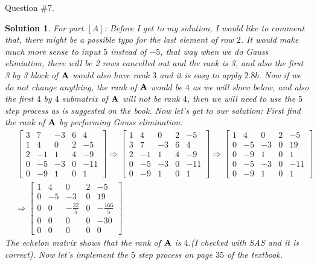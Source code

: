 \documentclass[11pt]{article}\usepackage[]{graphicx}\usepackage[]{color}
\newtheorem{sol}{Solution}
\begin{document}
Question $\# 7$.
\begin{sol}
	For part $[A]$:\vskip 2mm
	Before I get to my solution, I would like to comment that, there might be a possible typo for the last element of row $2$. It would make much more sense to input $5$ instead of $-5$, that way when we do Gauss elimiation, there will be 2 rows cancelled out and the rank is 3, and also the first 3 by 3 block of ${\bf A}$ would also have rank $3$ and it is easy to apply $2.8b$.\vskip 2mm
	Now if we do not change anything, the rank of ${\bf A}$ would be $4$ as we will show below, and also the first $4$ by $4$ submatrix of ${\bf A}$ will not be rank $4$, then we will need to use the $5$ step process as is suggested on the book. \vskip 2mm
	Now let's get to our solution:\vskip 2mm
	First find the rank of ${\bf A}$ by performing Gauss elimination:
	\begin{align*}
		&\  \left[\begin{array}{ccccc} 3&7&-3&6&4\\ 1&4&0&2&-5\\ 2&-1&1&4&-9\\ 0&-5&-3&0&-11\\ 0&-9&1&0&1\end{array}\right]\Longrightarrow \left[\begin{array}{ccccc} 1&4&0&2&-5\\ 3&7&-3&6&4\\ 2&-1&1&4&-9\\ 0&-5&-3&0&-11\\ 0&-9&1&0&1\end{array}\right] \Longrightarrow \left[\begin{array}{ccccc} 1&4&0&2&-5\\ 0&-5&-3&0&19\\ 0&-9&1&0&1\\ 0&-5&-3&0&-11\\ 0&-9&1&0&1\end{array}\right]\\
		&\Longrightarrow \left[\begin{array}{ccccc} 1&4&0&2&-5\\ 0&-5&-3&0&19\\ 0&0&-\frac{22}{5}&0&-\frac{166}{5}\\ 0&0&0&0&-30\\ 0&0&0&0&0\end{array}\right]
	\end{align*}
	The echelon matrix shows that the rank of ${\bf A}$ is $4$.(I checked with SAS and it is correct).\vskip 2mm
	Now let's implement the $5$ step process on page $35$ of the textbook.\vskip 2mm

\end{sol}
\end{document}
